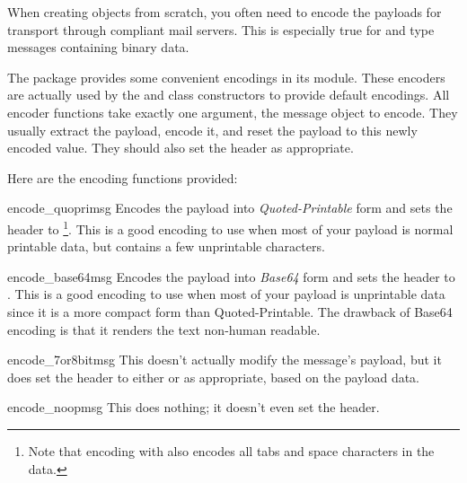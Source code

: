 
When creating  objects from scratch, you often need to
encode the payloads for transport through compliant mail servers.
This is especially true for  and 
type messages containing binary data.

The  package provides some convenient encodings in its
 module.  These encoders are actually used by the
 and  class constructors to provide default
encodings.  All encoder functions take exactly one argument, the
message object to encode.  They usually extract the payload, encode
it, and reset the payload to this newly encoded value.  They should also
set the  header as appropriate.

Here are the encoding functions provided:

\begin{funcdesc}{encode_quopri}{msg}
Encodes the payload into \emph{Quoted-Printable} form and sets the
 header to
\footnote{Note that encoding with
 also encodes all tabs and space characters in
the data.}.
This is a good encoding to use when most of your payload is normal
printable data, but contains a few unprintable characters.
\end{funcdesc}

\begin{funcdesc}{encode_base64}{msg}
Encodes the payload into \emph{Base64} form and sets the
 header to
.  This is a good encoding to use when most of your payload
is unprintable data since it is a more compact form than
Quoted-Printable.  The drawback of Base64 encoding is that it
renders the text non-human readable.
\end{funcdesc}

\begin{funcdesc}{encode_7or8bit}{msg}
This doesn't actually modify the message's payload, but it does set
the  header to either  or
 as appropriate, based on the payload data.
\end{funcdesc}

\begin{funcdesc}{encode_noop}{msg}
This does nothing; it doesn't even set the
 header.
\end{funcdesc}
